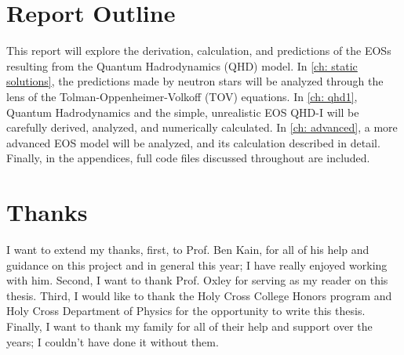 \section{Report Outline}

This report will explore the derivation, calculation, and predictions of the EOSs resulting from the Quantum Hadrodynamics (QHD) model. In \autoref{ch: static solutions}, the predictions made by neutron stars will be analyzed through the lens of the Tolman-Oppenheimer-Volkoff (TOV) equations. In \autoref{ch: qhd1}, Quantum Hadrodynamics and the simple, unrealistic EOS QHD-I will be carefully derived, analyzed, and numerically calculated. In \autoref{ch: advanced}, a more advanced EOS model will be analyzed, and its calculation described in detail. Finally, in the appendices, full code files discussed throughout are included.

\section{Thanks}

I want to extend my thanks, first, to Prof. Ben Kain, for all of his help and guidance on this project and in general this year; I have really enjoyed working with him. Second, I want to thank Prof. Oxley for serving as my reader on this thesis. Third, I would like to thank the Holy Cross College Honors program and Holy Cross Department of Physics for the opportunity to write this thesis. Finally, I want to thank my family for all of their help and support over the years; I couldn't have done it without them.
